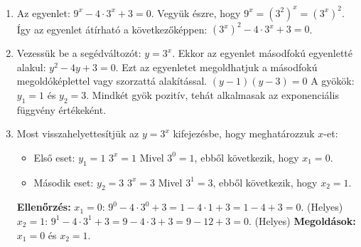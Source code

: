 \documentclass[a4paper,12pt]{article}
\theoremstyle{definition} %
\begin{document}
\begin{megoldasdoboz}
\begin{enumerate}[label=(\alph*)]
    \item Az egyenlet: $9^x - 4 \cdot 3^x + 3 = 0$.
    Vegyük észre, hogy $9^x = (3^2)^x = (3^x)^2$.
    Így az egyenlet átírható a következőképpen: $(3^x)^2 - 4 \cdot 3^x + 3 = 0$.
    \item Vezessük be a segédváltozót: $y = 3^x$.
    Ekkor az egyenlet másodfokú egyenletté alakul: $y^2 - 4y + 3 = 0$.
    Ezt az egyenletet megoldhatjuk a másodfokú megoldóképlettel vagy szorzattá alakítással.
    $(y-1)(y-3) = 0$
    A gyökök: $y_1 = 1$ és $y_2 = 3$.
    Mindkét gyök pozitív, tehát alkalmasak az exponenciális függvény értékeként.
    \item Most visszahelyettesítjük az $y = 3^x$ kifejezésbe, hogy meghatározzuk $x$-et:
    \begin{itemize}
        \item Első eset: $y_1 = 1$
        $3^x = 1$
        Mivel $3^0 = 1$, ebből következik, hogy $x_1 = 0$.
        \item Második eset: $y_2 = 3$
        $3^x = 3$
        Mivel $3^1 = 3$, ebből következik, hogy $x_2 = 1$.
    \end{itemize}

\textbf{Ellenőrzés:}
$x_1=0$: $9^0 - 4 \cdot 3^0 + 3 = 1 - 4 \cdot 1 + 3 = 1 - 4 + 3 = 0$. (Helyes)
$x_2=1$: $9^1 - 4 \cdot 3^1 + 3 = 9 - 4 \cdot 3 + 3 = 9 - 12 + 3 = 0$. (Helyes)
\textbf{Megoldások:} $x_1 = 0$ és $x_2 = 1$.
\end{enumerate}
\end{megoldasdoboz}
\end{document}
